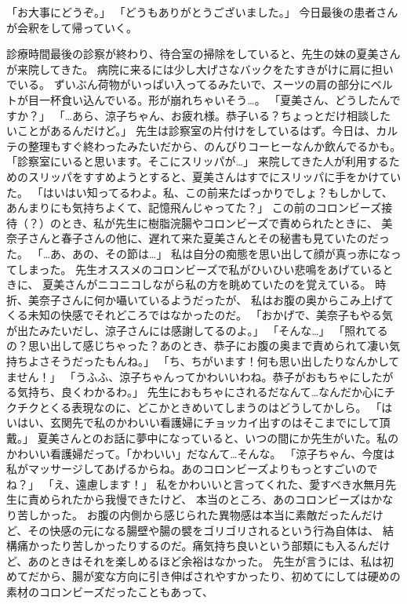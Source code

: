 「お大事にどうぞ。」
「どうもありがとうございました。」
今日最後の患者さんが会釈をして帰っていく。

診療時間最後の診察が終わり、待合室の掃除をしていると、先生の妹の夏美さんが来院してきた。
病院に来るには少し大げさなバックをたすきがけに肩に担いでいる。
ずいぶん荷物がいっぱい入ってるみたいで、スーツの肩の部分にベルトが目一杯食い込んでいる。形が崩れちゃいそう…。
「夏美さん、どうしたんですか？」
「…あら、涼子ちゃん、お疲れ様。恭子いる？ちょっとだけ相談したいことがあるんだけど。」
先生は診察室の片付けをしているはず。今日は、カルテの整理もすぐ終わったみたいだから、のんびりコーヒーなんか飲んでるかも。
「診察室にいると思います。そこにスリッパが…」
来院してきた人が利用するためのスリッパをすすめようとすると、夏美さんはすでにスリッパに手をかけていた。
「はいはい知ってるわよ。私、この前来たばっかりでしょ？もしかして、あんまりにも気持ちよくて、記憶飛んじゃってた？」
この前のコロンビーズ接待（？）のとき、私が先生に樹脂浣腸やコロンビーズで責められたときに、
美奈子さんと春子さんの他に、遅れて来た夏美さんとその秘書も見ていたのだった。
「…あ、あの、その節は…」
私は自分の痴態を思い出して顔が真っ赤になってしまった。
先生オススメのコロンビーズで私がひいひい悲鳴をあげているときに、
夏美さんがニコニコしながら私の方を眺めていたのを覚えている。
時折、美奈子さんに何か囁いているようだったが、
私はお腹の奥からこみ上げてくる未知の快感でそれどころではなかったのだ。
「おかげで、美奈子もやる気が出たみたいだし、涼子さんには感謝してるのよ。」
「そんな…」
「照れてるの？思い出して感じちゃった？あのとき、恭子にお腹の奥まで責められて凄い気持ちよさそうだったもんね。」
「ち、ちがいます！何も思い出したりなんかしてません！」
「うふふ、涼子ちゃんってかわいいわね。恭子がおもちゃにしたがる気持ち、良くわかるわ。」
先生におもちゃにされるだなんて…なんだか心にチクチクとくる表現なのに、どこかときめいてしまうのはどうしてかしら。
「はいはい、玄関先で私のかわいい看護婦にチョッカイ出すのはそこまでにして頂戴。」
夏美さんとのお話に夢中になっていると、いつの間にか先生がいた。私のかわいい看護婦だって。「かわいい」だなんて…そんな。
「涼子ちゃん、今度は私がマッサージしてあげるからね。あのコロンビーズよりもっとすごいのでね？」
「え、遠慮します！」
私をかわいいと言ってくれた、愛すべき水無月先生に責められたから我慢できたけど、
本当のところ、あのコロンビーズはかなり苦しかった。
お腹の内側から感じられた異物感は本当に素敵だったんだけど、その快感の元になる腸壁や腸の襞をゴリゴリされるという行為自体は、
結構痛かったり苦しかったりするのだ。痛気持ち良いという部類にも入るんだけど、あのときはそれを楽しめるほど余裕はなかった。
先生が言うには、私は初めてだから、腸が変な方向に引き伸ばされやすかったり、初めてにしては硬めの素材のコロンビーズだったこともあって、
